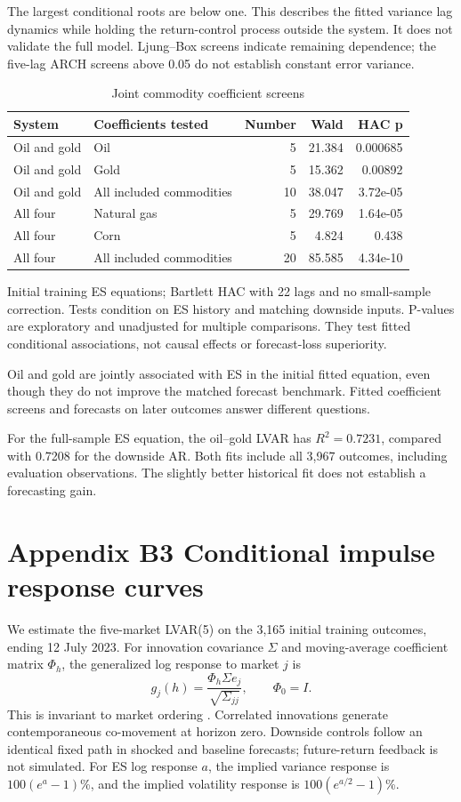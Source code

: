 \documentclass[11pt,letterpaper]{article}
\newcommand{\appendixpage}[2]{\clearpage\section*{#1}\label{#2}}
\begin{document}
The largest conditional roots are below one. This describes the fitted variance
lag dynamics while holding the return-control process outside the system. It does
not validate the full model. Ljung--Box screens indicate remaining dependence;
the five-lag ARCH screens above 0.05 do not establish constant error variance.

\begin{table}[H]
\centering
\caption{Joint commodity coefficient screens}\label{tab:joint}
\footnotesize
\begin{tabular}{llrrr}
\toprule
System & Coefficients tested & Number & Wald & HAC p \\
\midrule
Oil and gold & Oil & 5 & 21.384 & 0.000685 \\
Oil and gold & Gold & 5 & 15.362 & 0.00892 \\
Oil and gold & All included commodities & 10 & 38.047 & 3.72e-05 \\
All four & Natural gas & 5 & 29.769 & 1.64e-05 \\
All four & Corn & 5 & 4.824 & 0.438 \\
All four & All included commodities & 20 & 85.585 & 4.34e-10 \\
\bottomrule
\end{tabular}
\end{table}
{\footnotesize Initial training ES equations; Bartlett HAC with 22 lags and no small-sample correction. Tests condition on ES history and matching downside inputs. P-values are exploratory and unadjusted for multiple comparisons. They test fitted conditional associations, not causal effects or forecast-loss superiority.\par}

Oil and gold are jointly associated with ES in the initial fitted equation, even
though they do not improve the matched forecast benchmark. Fitted coefficient
screens and forecasts on later outcomes answer different questions.

For the full-sample ES equation, the oil--gold LVAR has $R^2=0.7231$,
compared with 0.7208 for the downside AR. Both fits include all 3,967 outcomes,
including evaluation observations. The slightly better historical fit does not
establish a forecasting gain.

\appendixpage{Appendix B3 Conditional impulse response curves}{app:irfs}
We estimate the five-market LVAR(5) on the 3,165 initial training outcomes,
ending 12 July 2023. For innovation covariance $\Sigma$ and moving-average
coefficient matrix $\Phi_h$, the generalized log response to market $j$ is
\begin{equation}
g_j(h)=\frac{\Phi_h\Sigma e_j}{\sqrt{\Sigma_{jj}}},
\qquad \Phi_0=I.
\end{equation}
This is invariant to market ordering \cite{pesaran}. Correlated innovations
generate contemporaneous co-movement at horizon zero. Downside controls follow an
identical fixed path in shocked and baseline forecasts; future-return feedback is
not simulated. For ES log response $a$, the implied variance response is
$100(e^a-1)$\%, and the implied volatility response is $100(e^{a/2}-1)$\%.
\end{document}
